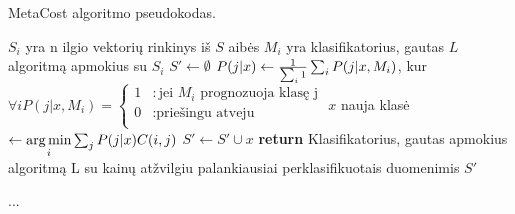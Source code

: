 \begin{algorithm}
\caption{MetaCost algoritmo pseudokodas.}
\begin{algorithmic}[1]
            \State $S_i$ yra n ilgio vektorių rinkinys iš $S$ aibės
            \State $M_i$ yra klasifikatorius, gautas $L$ algoritmą apmokius su $S_i$
        \EndFor
        \State $S'\gets \emptyset$
                \State $P(j|x) \gets {1 \over  \sum_i 1} \sum_i P(j|x, M_i)$, kur 
                \State $\forall i P(j|x, M_i) = \left\{
                    \begin{array}{lr} 
                        1 & : \text{jei $M_i$ prognozuoja klasę j} \\ 0 & : \text{priešingu atveju} \\
                    \end{array} \right. $ 
            \EndFor
            \State $x$ nauja klasė $\gets \underset{i}{\operatorname*{arg\,min}} \sum_j P(j|x) C(i,j)$
            \State $S'\gets S' \cup x$
        \EndFor
        \State \textbf{return} Klasifikatorius, gautas apmokius algoritmą L su kainų atžvilgiu palankiausiai perklasifikuotais duomenimis $S'$ 
    \EndProcedure{}
\end{algorithmic}
\label{alg:MetaCost pseudokodas} 
\end{algorithm}

...
